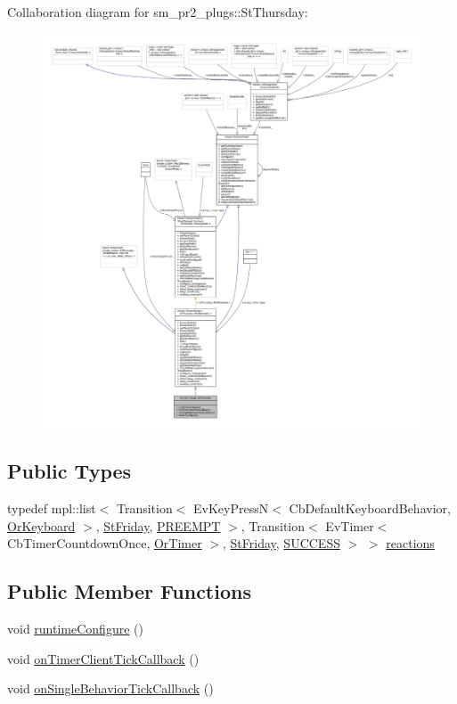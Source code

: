 Collaboration diagram for sm\+\_\+pr2\+\_\+plugs\+:\+:St\+Thursday\+:
\nopagebreak
\begin{figure}[H]
\begin{center}
\leavevmode
\includegraphics[width=350pt]{structsm__pr2__plugs_1_1StThursday__coll__graph}
\end{center}
\end{figure}
\subsection*{Public Types}
\begin{DoxyCompactItemize}
\item 
typedef mpl\+::list$<$ Transition$<$ Ev\+Key\+PressN$<$ Cb\+Default\+Keyboard\+Behavior, \hyperlink{classsm__pr2__plugs_1_1OrKeyboard}{Or\+Keyboard} $>$, \hyperlink{structsm__pr2__plugs_1_1StFriday}{St\+Friday}, \hyperlink{classPREEMPT}{P\+R\+E\+E\+M\+PT} $>$, Transition$<$ Ev\+Timer$<$ Cb\+Timer\+Countdown\+Once, \hyperlink{classsm__pr2__plugs_1_1OrTimer}{Or\+Timer} $>$, \hyperlink{structsm__pr2__plugs_1_1StFriday}{St\+Friday}, \hyperlink{classSUCCESS}{S\+U\+C\+C\+E\+SS} $>$ $>$ \hyperlink{structsm__pr2__plugs_1_1StThursday_a403fb205b005edf2aa474205db1da9b8}{reactions}
\end{DoxyCompactItemize}
\subsection*{Public Member Functions}
\begin{DoxyCompactItemize}
\item 
void \hyperlink{structsm__pr2__plugs_1_1StThursday_a8b075b330b5fa818576de7e2fc559a4b}{runtime\+Configure} ()
\item 
void \hyperlink{structsm__pr2__plugs_1_1StThursday_aae1a61d01505f8109f331ceb0c507cdd}{on\+Timer\+Client\+Tick\+Callback} ()
\item 
void \hyperlink{structsm__pr2__plugs_1_1StThursday_a14078eeae0dfb4030bb9021f938aaa6e}{on\+Single\+Behavior\+Tick\+Callback} ()
\end{DoxyCompactItemize}
